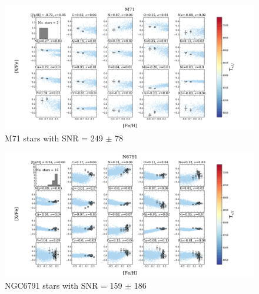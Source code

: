 \documentclass[14pt, preprint2]{aastex6}
\begin{document}
\begin{figure}
\centering
           \includegraphics[scale=0.5]{20elem8_tc2_nofilt.pdf}
  \caption{ M71 stars with SNR = 249 $\pm$ 78}
\label{fig:c4}
\end{figure}


\begin{figure}
\centering
    \includegraphics[scale=0.5]{20elem-3_tc2_nofilt.pdf}
  \caption{ NGC6791 stars with SNR = 159 $\pm$ 186 }
\label{fig:c5}
\end{figure}
\end{document}

